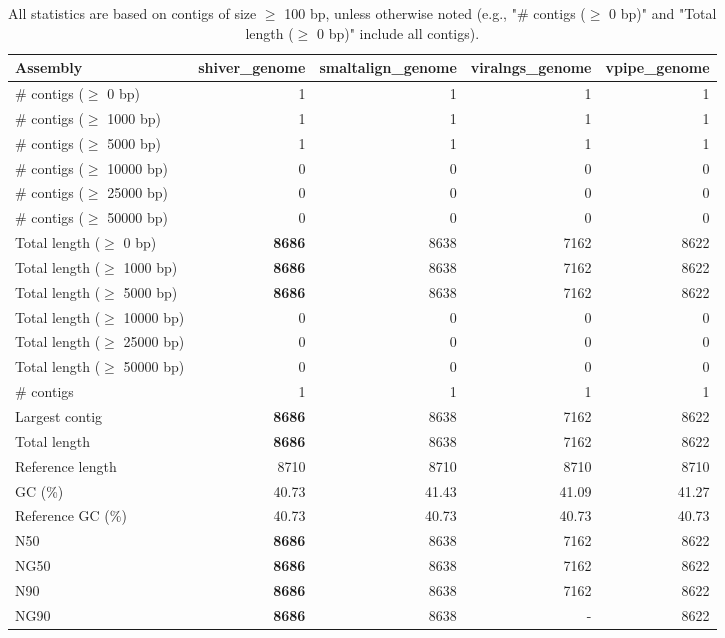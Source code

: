 \documentclass[12pt,a4paper]{article}
\begin{document}
\begin{table}[ht]
\begin{center}
\caption{All statistics are based on contigs of size $\geq$ 100 bp, unless otherwise noted (e.g., "\# contigs ($\geq$ 0 bp)" and "Total length ($\geq$ 0 bp)" include all contigs).}
\begin{tabular}{|l*{4}{|r}|}
\hline
Assembly & shiver\_genome & smaltalign\_genome & viralngs\_genome & vpipe\_genome \\ \hline
\# contigs ($\geq$ 0 bp) & 1 & 1 & 1 & 1 \\ \hline
\# contigs ($\geq$ 1000 bp) & 1 & 1 & 1 & 1 \\ \hline
\# contigs ($\geq$ 5000 bp) & 1 & 1 & 1 & 1 \\ \hline
\# contigs ($\geq$ 10000 bp) & 0 & 0 & 0 & 0 \\ \hline
\# contigs ($\geq$ 25000 bp) & 0 & 0 & 0 & 0 \\ \hline
\# contigs ($\geq$ 50000 bp) & 0 & 0 & 0 & 0 \\ \hline
Total length ($\geq$ 0 bp) & {\bf 8686} & 8638 & 7162 & 8622 \\ \hline
Total length ($\geq$ 1000 bp) & {\bf 8686} & 8638 & 7162 & 8622 \\ \hline
Total length ($\geq$ 5000 bp) & {\bf 8686} & 8638 & 7162 & 8622 \\ \hline
Total length ($\geq$ 10000 bp) & 0 & 0 & 0 & 0 \\ \hline
Total length ($\geq$ 25000 bp) & 0 & 0 & 0 & 0 \\ \hline
Total length ($\geq$ 50000 bp) & 0 & 0 & 0 & 0 \\ \hline
\# contigs & 1 & 1 & 1 & 1 \\ \hline
Largest contig & {\bf 8686} & 8638 & 7162 & 8622 \\ \hline
Total length & {\bf 8686} & 8638 & 7162 & 8622 \\ \hline
Reference length & 8710 & 8710 & 8710 & 8710 \\ \hline
GC (\%) & 40.73 & 41.43 & 41.09 & 41.27 \\ \hline
Reference GC (\%) & 40.73 & 40.73 & 40.73 & 40.73 \\ \hline
N50 & {\bf 8686} & 8638 & 7162 & 8622 \\ \hline
NG50 & {\bf 8686} & 8638 & 7162 & 8622 \\ \hline
N90 & {\bf 8686} & 8638 & 7162 & 8622 \\ \hline
NG90 & {\bf 8686} & 8638 & - & 8622 \\ \hline

\end{tabular}
\end{center}
\end{table}
\end{document}
